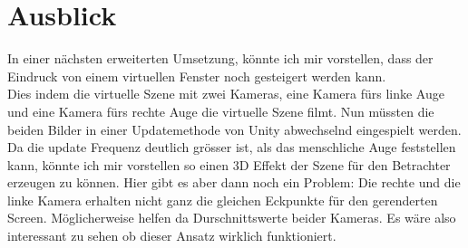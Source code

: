 \section{Ausblick}
In einer nächsten erweiterten Umsetzung, könnte ich mir vorstellen, dass der Eindruck von einem virtuellen Fenster noch gesteigert werden kann. \\ Dies indem die virtuelle Szene mit zwei Kameras, eine Kamera fürs linke Auge und eine Kamera fürs rechte Auge die virtuelle Szene filmt. Nun müssten die beiden Bilder in einer Updatemethode von Unity abwechselnd eingespielt werden. Da die update Frequenz deutlich grösser ist, als das menschliche Auge feststellen kann, könnte ich mir vorstellen so einen 3D Effekt der Szene für den Betrachter erzeugen zu können. Hier gibt es aber dann noch ein Problem: Die rechte und die linke Kamera erhalten nicht ganz die gleichen Eckpunkte für den gerenderten Screen. Möglicherweise helfen da Durschnittswerte beider Kameras. Es wäre also interessant zu sehen ob dieser Ansatz wirklich funktioniert.
